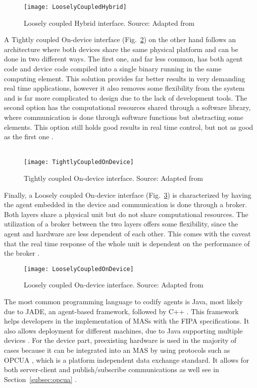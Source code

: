 \begin{figure}[h!]
	\centering
	\texttt{[image: LooselyCoupledHybrid]}
	\caption{Loosely coupled Hybrid interface. Source: Adapted from \cite{8591641}}
	\label{fig:loosely_coupled_hybrid}
\end{figure}

A Tightly coupled On-device interface (Fig.~\ref{fig:tightly_coupled_ondevice}) on the other hand follows an architecture where both devices share the same physical platform and can be done in two different ways. The first one, and far less common, has both agent code and device code compiled into a single binary running in the same computing element. This solution provides far better results in very demanding real time applications, however it also removes some flexibility from the system and is far more complicated to design due to the lack of development tools. The second option has the computational resources shared through a software library, where communication is done through software functions but abstracting some elements. This option still holds good results in real time control, but not as good as the first one \cite{8591641}.\\\\

\begin{figure}[h!]
	\centering
	\texttt{[image: TightlyCoupledOnDevice]}
	\caption{Tightly coupled On-device interface. Source: Adapted from \cite{8591641}}
	\label{fig:tightly_coupled_ondevice}
\end{figure}

Finally, a Loosely coupled On-device interface (Fig.~\ref{fig:loosely_coupled_ondevice}) is characterized by having the agent embedded in the device and communication is done through a broker. Both layers share a physical unit but do not share computational resources. The utilization of a broker between the two layers offers some flexibility, since the agent and hardware are less dependent of each other. This comes with the caveat that the real time response of the whole unit is dependent on the performance of the broker \cite{8591641}.\\

\begin{figure}[h!]
	\centering
	\texttt{[image: LooselyCoupledOnDevice]}
	\caption{Loosely coupled On-device interface. Source: Adapted from \cite{8591641}}
	\label{fig:loosely_coupled_ondevice}
\end{figure}

The most common programming language to codify agents is Java, most likely due to JADE, an agent-based framework, followed by C++ \cite{8591641}. This framework helps developers in the implementation of \gls{MAS}s with the \gls{FIPA} specifications. It also allows deployment for different machines, due to Java supporting multiple devices \cite{JADE_website}.
For the device part, preexisting hardware is used in the majority of cases because it can be integrated into an \gls{MAS} by using protocols such as \gls{OPCUA} \cite{8591641}, which is a platform independent data exchange standard. It allows for both server-client and publish/subscribe communications as well see in Section~\ref{subsec:opcua} \cite{OPCUA_website}.

